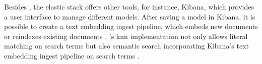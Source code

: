 



Besides \databaseName{}, the elastic stack offers other tools, for instance, Kibana, which provides a user interface to manage different models.
After saving a model in Kibana, it is possible to create a text embedding ingest pipeline, which embeds new documents or reindexes existing documents \cite{Elasticsearch-knn-embedding}.
\databaseName{}'s \ac{knn} implementation not only allows literal matching on search terms 
but also semantic search incorporating Kibana's text embedding ingest pipeline on search terms \cite{Elasticsearch-knn}.